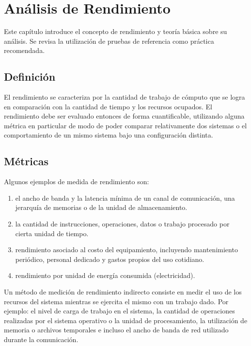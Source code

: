 \documentclass[a4paper]{report}
\begin{document}
\chapter{Análisis de Rendimiento}

Este capítulo introduce el concepto de rendimiento y teoría básica sobre su análisis.
Se revisa la utilización de pruebas de referencia como práctica recomendada.

\section{Definición}

El rendimiento se caracteriza por la cantidad de trabajo de cómputo que se
logra en comparación con la cantidad de tiempo y los recursos ocupados.
El rendimiento debe ser evaluado entonces de forma cuantificable, utilizando alguna
métrica en particular de modo de poder comparar relativamente dos sistemas o
el comportamiento de un mismo sistema bajo una configuración distinta.

\section{Métricas}

Algunos ejemplos de medida de rendimiento son:

\begin{enumerate}
\item el ancho de banda y la latencia mínima de un canal de comunicación,
  una jerarquía de memorias o de la unidad de almacenamiento.
\item la cantidad de instrucciones, operaciones, datos o trabajo procesado
  por cierta unidad de tiempo.
\item rendimiento asociado al costo del equipamiento, incluyendo mantenimiento
 periódico, personal dedicado y gastos propios del uso cotidiano.
\item rendimiento por unidad de energía consumida (electricidad).

\end{enumerate}

Un método de medición de rendimiento indirecto consiste en medir el uso de
los recursos del sistema mientras se ejercita el mismo con un trabajo dado.
Por ejemplo: el nivel de carga de trabajo en el sistema, la cantidad de operaciones realizadas por el
sistema operativo o la unidad de procesamiento, la utilización de memoria o
archivos temporales e incluso el ancho de banda de red utilizado durante la comunicación.
\end{document}
